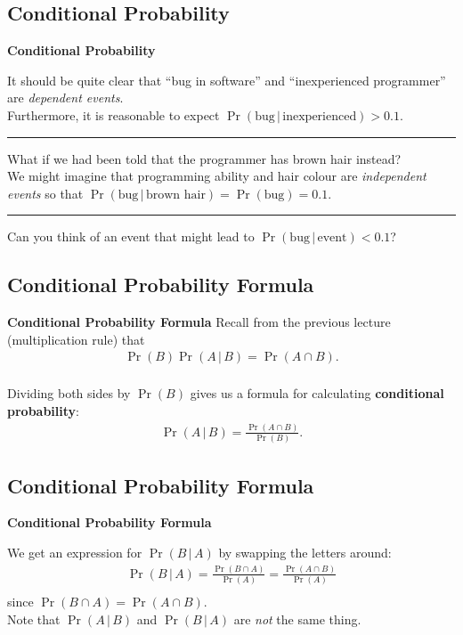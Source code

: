 \documentclass[compress]{beamer}        %
\makeatletter
\newcommand{\tcb}{\textcolor{beamer@blendedblue}}
\makeatother
\begin{document}
\subsection{Conditional Probability}
\begin{frame}{\bf \tcb{Conditional Probability}}

It should be quite clear that ``bug in software'' and ``inexperienced programmer'' are \emph{dependent events}.\\[0.3cm]
Furthermore, it is reasonable to expect $\Pr(\text{bug}\,|\,\text{inexperienced}) > 0.1$.\\[0.6cm]
\hrule\vspace{0.6cm}

What if we had been told that the programmer has brown hair instead?\\[0.3cm]
We might imagine that programming ability and hair colour are \emph{independent events} so that $\Pr(\text{bug}\,|\,\text{brown hair}) = \Pr(\text{bug}) = 0.1$.\\[0.6cm]
\hrule\vspace{0.6cm}

Can you think of an event that might lead to  $\Pr(\text{bug}\,|\,\text{event}) < 0.1$?
\end{frame}


\subsection{Conditional Probability Formula}
\begin{frame}{\bf \tcb{Conditional Probability Formula}}
Recall from the previous lecture (multiplication rule) that
\begin{align*}
\Pr(B) \Pr(A \,|\, B) = \Pr(A \cap B).\\[0.4cm]
\end{align*}

Dividing both sides by $\Pr(B)$ gives us a formula for calculating {\bf conditional probability}:\\[-0.2cm]
\begin{align*}
\boxed{\Pr(A \,|\, B) = \frac{\Pr(A \cap B)}{\Pr(B)}}.
\end{align*}

\end{frame}


\subsection{Conditional Probability Formula}
\begin{frame}{\bf \tcb{Conditional Probability Formula}}

We get an expression for $\Pr(B \,|\, A)$ by swapping the letters around:\\[0.2cm]
\begin{align*}
\Pr(B \,|\, A) = \frac{\Pr(B \cap A)}{\Pr(A)} = \frac{\Pr(A \cap B)}{\Pr(A)}\\
\end{align*}
since $\Pr(B \cap A) = \Pr(A \cap B)$.\\[1.6cm]
Note that $\Pr(A \,|\, B)$ and $\Pr(B \,|\, A)$ are \emph{not} the same thing.

\end{frame}
\end{document}

